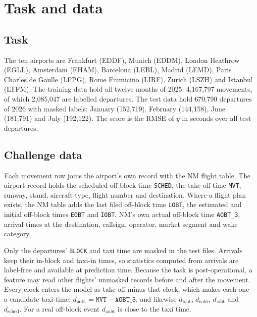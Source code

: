 \documentclass[
  manuscript=article,
  layout=preprint,
  year=2026,
  volume=x,
]{extra/joas}
\newcommand{\fld}[1]{\texttt{#1}}
\begin{document}
\section{Task and data}
\label{sec:data}

\subsection{Task}

The ten airports are Frankfurt (EDDF), Munich (EDDM), London Heathrow (EGLL), Amsterdam (EHAM), Barcelona (LEBL), Madrid (LEMD),
Paris Charles de Gaulle (LFPG), Rome Fiumicino (LIRF), Zurich (LSZH) and Istanbul (LTFM). The training data hold all twelve months of
2025: 4,167,797 movements, of which 2,085,047 are labelled departures. The test data hold 670,790 departures of 2026 with masked labels:
January (152,719), February (144,158), June (181,791) and July (192,122). The score is the RMSE of $y$ in seconds over all test
departures.

\subsection{Challenge data}

Each movement row joins the airport's own record with the NM flight table. The airport record holds the scheduled off-block time
\fld{SCHED}, the take-off time \fld{MVT}, runway, stand, aircraft type, flight number and destination. Where a flight plan exists, the
NM table adds the last filed off-block time \fld{LOBT}, the estimated and initial off-block times \fld{EOBT} and \fld{IOBT}, NM's own
actual off-block time \fld{AOBT\_3}, arrival times at the destination, callsign, operator, market segment and wake category.

Only the departures' \fld{BLOCK} and taxi time are masked in the test files. Arrivals keep their in-block and taxi-in times, so
statistics computed from arrivals are label-free and available at prediction time. Because the task is post-operational, a feature may
read other flights' unmasked records before and after the movement. Every clock enters the model as take-off minus that clock, which
makes each one a candidate taxi time: $d_{\mathrm{aobt}} = \fld{MVT} - \fld{AOBT\_3}$, and likewise $d_{\mathrm{lobt}}$,
$d_{\mathrm{eobt}}$, $d_{\mathrm{iobt}}$ and $d_{\mathrm{sched}}$. For a real off-block event $d_{\mathrm{aobt}}$ is close to the taxi
time.
\end{document}
